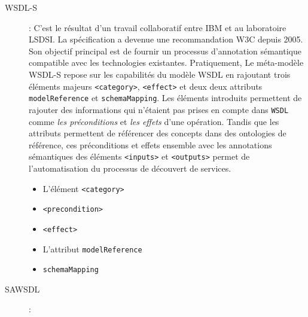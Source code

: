 	    \renewcommand{\descriptionlabel}[1]{\hspace{1cm}\textbf{#1}} 
	    \begin{description}
		\item[WSDL-S]: 
		    C'est le résultat d'un travail collaboratif entre IBM et au laboratoire LSDSI. La spécification 
		    a devenue une recommandation \textsc{W3C} depuis 2005. Son objectif principal est de fournir un
		    processus d'annotation sémantique compatible avec les technologies existantes. Pratiquement, Le
		    méta-modèle \textsc{WSDL-S} repose sur les capabilités du modèle \textsc{WSDL} 
		    en rajoutant trois éléments majeurs \texttt{<category>}, \texttt{<effect>} et deux deux attributs
		    \texttt{modelReference} et \texttt{schemaMapping}. Les éléments introduits permettent de 
		    rajouter des informations qui n'étaient pas prises en compte dans \texttt{WSDL} comme 
		    \emph{les préconditions} et \emph{les effets} d'une opération. Tandis que les attributs permettent 
		    de référencer des concepts dans des ontologies de référence, ces préconditions et effets ensemble
		    avec les annotations sémantiques des éléments \texttt{<inputs>} et \texttt{<outputs>} permet de
		    l'automatisation du processus de découvert de services.


		    \begin{itemize}
			\item L'élément \texttt{<category>}
			\item \texttt{<precondition>}
			\item \texttt{<effect>}
			\item L'attribut \texttt{modelReference}
			\item \texttt{schemaMapping}
		    \end{itemize}
		\item[SAWSDL]:
	    \end{description}
